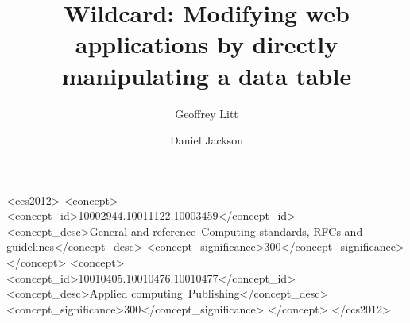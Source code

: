 \documentclass[english,submission]{programming}
\begin{document}
\title{Wildcard: Modifying web applications by directly manipulating a
data table}
\subtitle{}%

\author{Geoffrey Litt}
\author{Daniel Jackson}





\begin{CCSXML}
<ccs2012>
<concept>
<concept_id>10002944.10011122.10003459</concept_id>
<concept_desc>General and reference~Computing standards, RFCs and guidelines</concept_desc>
<concept_significance>300</concept_significance>
</concept>
<concept>
<concept_id>10010405.10010476.10010477</concept_id>
<concept_desc>Applied computing~Publishing</concept_desc>
<concept_significance>300</concept_significance>
</concept>
</ccs2012>
\end{CCSXML}



\maketitle
\end{document}

